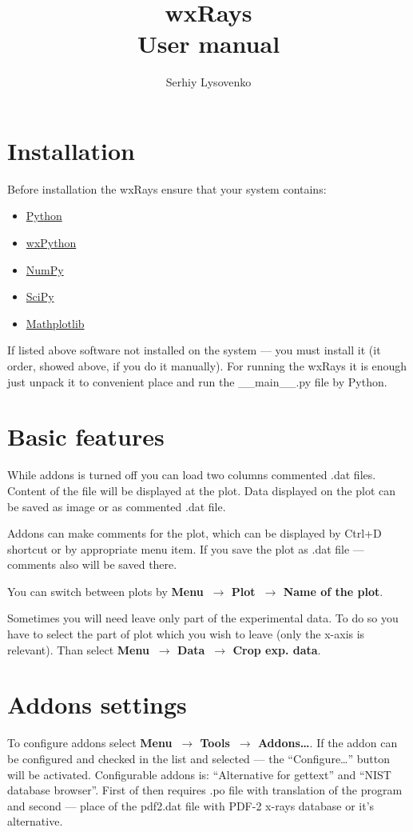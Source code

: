 \documentclass[a4paper,12pt]{article}
\begin{document}
\title{wxRays\\User manual}
\author{Serhiy Lysovenko}
\maketitle
\tableofcontents
\sloppy
\section{Installation}
Before installation the wxRays ensure that your system contains:
\begin{itemize}
\item \href{http://python.org/}{Python}
\item \href{http://www.wxpython.org/}{wxPython}
\item \href{http://www.numpy.org/}{NumPy}
\item \href{http://www.scipy.org/}{SciPy}
\item \href{http://matplotlib.org/}{Mathplotlib}
\end{itemize}

If listed above software not installed on the system --- you must install it (it order, showed above, if you do it manually). For running the wxRays it is enough just unpack it to convenient place and run the {\ttfamily \_\_main\_\_.py} file by Python.

\section{Basic features}
While addons is turned off you can load two columns commented {\ttfamily *.dat} files. Content of the file will be displayed at the plot. Data displayed on the plot can be saved as image or as commented {\ttfamily *.dat} file.

Addons can make comments for the plot, which can be displayed by Ctrl+D shortcut or by appropriate menu item. If you save the plot as {\ttfamily *.dat} file --- comments also will be saved there.

You can switch between plots by {\bfseries Menu~$\to$ Plot~$\to$ Name of the plot}.

Sometimes you will need leave only part of the experimental data. To do so you have to select the part of plot which you wish to leave (only the x-axis is relevant). Than select {\bfseries Menu~$\to$ Data~$\to$ Crop exp. data}.


\section{Addons settings}
To configure addons select {\bfseries Menu~$\to$ Tools~$\to$ Addons\ldots}. If the addon can be configured and checked in the list and selected --- the ``Configure\ldots'' button will be activated. Configurable addons is: ``Alternative for gettext'' and ``NIST database browser''. First of then requires {\ttfamily *.po} file with translation of the program and second --- place of the {\ttfamily pdf2.dat} file with PDF-2 x-rays database or it's alternative.
\end{document}

